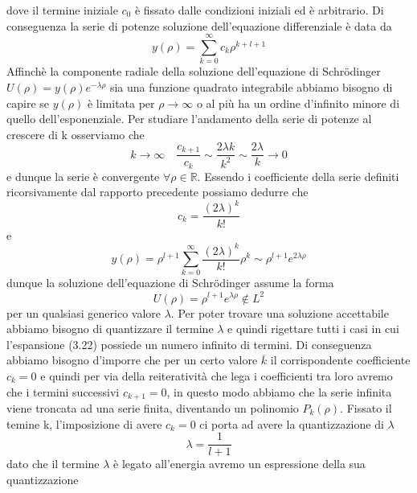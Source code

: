dove il termine iniziale $c_0$ \`e fissato dalle condizioni iniziali ed \`e arbitrario. Di conseguenza la serie di potenze soluzione dell'equazione differenziale \`e data da 
\begin{equation}
	y(\rho) = \sum_{k=0}^{\infty} c_k \rho^{k+l+1}
\end{equation}
Affinch\`e la componente radiale  della soluzione dell'equazione di Schr\"odinger $U(\rho) = y(\rho)e^{-\lambda \rho}$ sia una funzione quadrato integrabile abbiamo bisogno di capire se $y(\rho)$ \`e limitata per $\rho \to \infty$ o al pi\`u ha un ordine d'infinito minore di quello dell'esponenziale. Per studiare l'andamento della serie di potenze al crescere di k osserviamo che 
\begin{equation*}
	k \to \infty \quad \frac{c_{k+1}}{c_k} \sim \frac{2\lambda k}{k^2} \sim \frac{2\lambda }{k} \to 0 
\end{equation*}
e dunque la serie \`e convergente $\forall \rho \in \mathbb{R}$. Essendo i coefficiente della serie definiti ricorsivamente dal rapporto precedente possiamo dedurre che 
\begin{equation*}
	c_k = \frac{(2\lambda)^k}{k!}
\end{equation*}
e  
\begin{equation*}
	y(\rho) = \rho^{l+1}\sum_{k=0}^{\infty} \frac{(2\lambda)^k}{k!}\rho^k \sim \rho^{l+1}e^{2\lambda \rho}
\end{equation*}
dunque la soluzione dell'equazione di Schr\"odinger assume la forma 
\begin{equation*}
	U(\rho)= \rho^{l+1}e^{\lambda \rho} \not\in L^2
\end{equation*}
per un qualsiasi generico valore $\lambda$.  Per poter trovare una soluzione accettabile abbiamo bisogno di quantizzare il termine $\lambda $ e quindi rigettare tutti i casi in cui l'espansione (3.22) possiede un numero infinito di termini. Di conseguenza abbiamo bisogno d'imporre che per un certo valore $\overline{k}$ il corrispondente coefficiente $c_{k} = 0$ e quindi per via della reiterativit\`a che lega i coefficienti tra loro avremo che i termini successivi $c_{k+1}=0$, in questo modo abbiamo che la serie infinita viene troncata ad una serie finita, diventando un polinomio $P_k(\rho)$. 
Fissato il temine k, l'imposizione di avere $c_k = 0$ ci porta ad avere la quantizzazione di $\lambda$
\begin{equation*}
	\lambda  = \frac{1}{l+1}
\end{equation*} 
dato che il termine $\lambda$ \`e legato all'energia avremo un espressione della sua quantizzazione
